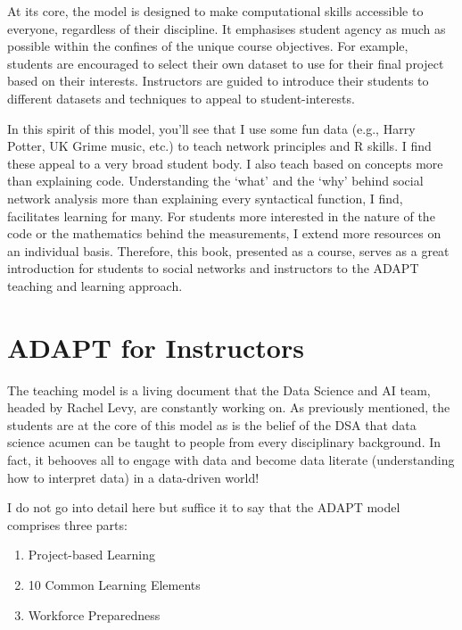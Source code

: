 \documentclass[
  letterpaper,
  DIV=11,
  numbers=noendperiod]{scrreprt}
\begin{document}
At its core, the model is designed to make computational skills
accessible to everyone, regardless of their discipline. It emphasises
student agency as much as possible within the confines of the unique
course objectives. For example, students are encouraged to select their
own dataset to use for their final project based on their interests.
Instructors are guided to introduce their students to different datasets
and techniques to appeal to student-interests.

In this spirit of this model, you'll see that I use some fun data (e.g.,
Harry Potter, UK Grime music, etc.) to teach network principles and R
skills. I find these appeal to a very broad student body. I also teach
based on concepts more than explaining code. Understanding the `what'
and the `why' behind social network analysis more than explaining every
syntactical function, I find, facilitates learning for many. For
students more interested in the nature of the code or the mathematics
behind the measurements, I extend more resources on an individual basis.
Therefore, this book, presented as a course, serves as a great
introduction for students to social networks and instructors to the
ADAPT teaching and learning approach.

\section{ADAPT for Instructors}\label{adapt-for-instructors}

The teaching model is a living document that the Data Science and AI
team, headed by Rachel Levy, are constantly working on. As previously
mentioned, the students are at the core of this model as is the belief
of the DSA that data science acumen can be taught to people from every
disciplinary background. In fact, it behooves all to engage with data
and become data literate (understanding how to interpret data) in a
data-driven world!

I do not go into detail here but suffice it to say that the ADAPT model
comprises three parts:

\begin{enumerate}
\def\labelenumi{\arabic{enumi}.}
\item
  Project-based Learning
\item
  10 Common Learning Elements
\item
  Workforce Preparedness
\end{enumerate}
\end{document}
